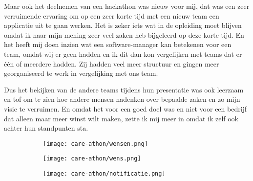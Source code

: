 Maar ook het deelnemen van een hackathon was nieuw voor mij, dat was een zeer verruimende ervaring om op een zeer korte tijd met een nieuw team een applicatie uit te gaan werken. Het is zeker iets wat in de opleiding moet blijven omdat ik naar mijn mening zeer veel zaken heb bijgeleerd op deze korte tijd. En het heeft mij doen inzien wat een software\hyp{}manager kan betekenen voor een team, omdat wij er geen hadden en ik dit dan kon vergelijken met teams dat er één of meerdere hadden. Zij hadden veel meer structuur en gingen meer georganiseerd te werk in vergelijking met ons team.

Dus het bekijken van de andere teams tijdens hun presentatie was ook leerzaam en tof om te zien hoe andere mensen nadenken over bepaalde zaken en zo mijn visie te verruimen. En omdat het voor een goed doel was en niet voor een bedrijf dat alleen maar meer winst wilt maken, zette ik mij meer in omdat ik zelf ook achter hun standpunten sta.

\begin{figure}[!h]
  \centering
  \begin{subfigure}[h]{0.3\textwidth}
    \centering
    \texttt{[image: care-athon/wensen.png]}
  \end{subfigure}
  \begin{subfigure}[h]{0.3\textwidth}
    \centering
    \texttt{[image: care-athon/wens.png]}
  \end{subfigure}
  \begin{subfigure}[h]{0.3\textwidth}
    \centering
    \texttt{[image: care-athon/notificatie.png]}
  \end{subfigure}
\end{figure}